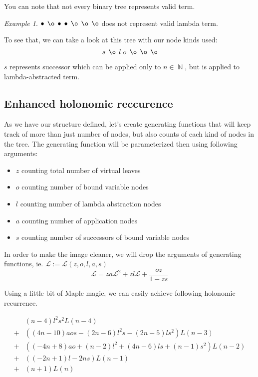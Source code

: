 \documentclass[final]{article}
\theoremstyle{definition}
\theoremstyle{remark}
\newtheorem{example}{Example}[subsection]
\newcommand{\gf}[1]{\ensuremath{\mathcal{#1}}}
\DeclareMathOperator{\N}{\mathbb{N}}
\DeclareMathOperator{\n}{\bullet}
\DeclareMathOperator{\no}{\o}
\begin{document}
You can note that not every binary tree represents valid term.

\begin{example}
    \(\n\; \no\; \n\; \n\; \no\; \no\; \no\) does not represent valid lambda term.
\end{example}

To see that, we can take a look at this tree with our node kinds used:
    \[s\; \no\; l\; o\; \no\; \no\; \no\]

\(s\) represents successor which can be applied only to \(n \in \N\), but is applied to lambda-abstracted term.

\subsection{Enhanced holonomic reccurence}%
\label{sub:enhanced_holonomic_reccurence}

As we have our structure defined, let's create generating functions that will keep track of more than just number of nodes, but also counts of each kind of nodes in the tree. The generating function will be parameterized then using following arguments:
\begin{itemize}
    \item \(z\) counting total number of virtual leaves
    \item \(o\) counting number of bound variable nodes
    \item \(l\) counting number of lambda abstraction nodes
    \item \(a\) counting number of application nodes
    \item \(s\) counting number of successors of bound variable nodes
\end{itemize}

In order to make the image cleaner, we will drop the arguments of generating functions, ie. \(\gf{L} := \gf{L}(z, o, l, a, s)\)
\[\gf{L} = z a \gf{L}^2 + z l \gf{L} + \frac{o z}{1 - z s}\]

Using a little bit of Maple magic, we can easily achieve following holonomic recurrence.

\[\begin{array}{rl}
        & (n - 4) l^2 s^2 L(n - 4)\\
        +& ((4 n - 10) a o s - (2 n - 6) l^2 s - (2 n - 5) l s^2) L(n - 3)\\
        +& ((-4 n + 8) a o + (n - 2) l^2 + (4 n - 6) l s + (n - 1) s^2) L(n - 2)\\
        +& ((-2 n + 1) l - 2 n s) L(n - 1)\\
        +& (n + 1) L(n)
\end{array}\]
\end{document}
